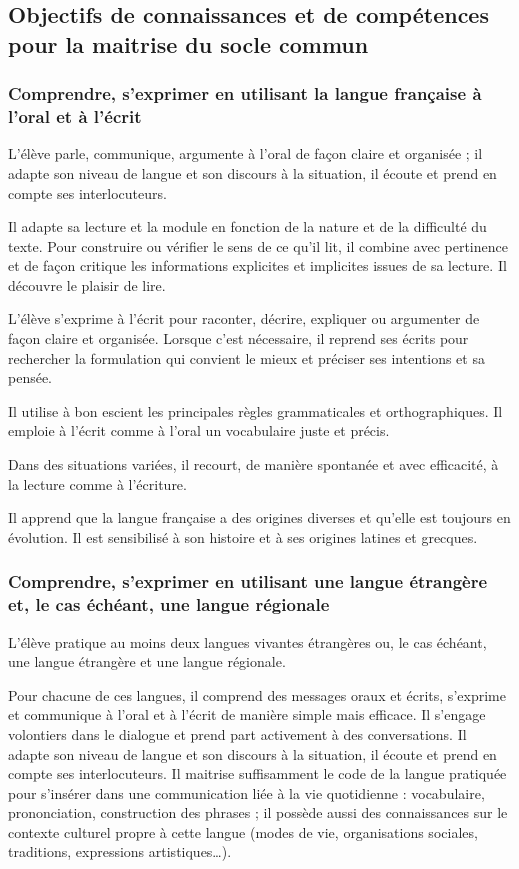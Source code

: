 \subsection{Objectifs de connaissances et de compétences pour la maitrise du socle commun}
\subsubsection{Comprendre, s’exprimer en utilisant la langue française à l’oral et à l’écrit}
L’élève parle, communique, argumente à l’oral de façon claire et organisée ; il adapte son niveau de langue et son discours à la situation, il écoute et prend en compte ses interlocuteurs.

Il adapte sa lecture et la module en fonction de la nature et de la difficulté du texte. Pour construire ou vérifier le sens de ce qu’il lit, il combine avec pertinence et de façon critique les informations explicites et implicites issues de sa lecture. Il découvre le plaisir de lire.

L’élève s’exprime à l’écrit pour raconter, décrire, expliquer ou argumenter de façon claire et organisée. Lorsque c’est nécessaire, il reprend ses écrits pour rechercher la formulation qui convient le mieux et préciser ses intentions et sa pensée.

Il utilise à bon escient les principales règles grammaticales et orthographiques. Il emploie à l’écrit comme à l’oral un vocabulaire juste et précis.

Dans des situations variées, il recourt, de manière spontanée et avec efficacité, à la lecture comme à l’écriture.

Il apprend que la langue française a des origines diverses et qu’elle est toujours en évolution. Il est sensibilisé à son histoire et à ses origines latines et grecques.

\subsubsection{Comprendre, s’exprimer en utilisant une langue étrangère et, le cas échéant, une langue régionale}
L’élève pratique au moins deux langues vivantes étrangères ou, le cas échéant, une langue étrangère et une langue régionale.

Pour chacune de ces langues, il comprend des messages oraux et écrits, s’exprime et communique à l’oral et à l’écrit de manière simple mais efficace. Il s’engage volontiers dans le dialogue et prend part activement à des conversations. Il adapte son niveau de langue et son discours à la situation, il écoute et prend en compte ses interlocuteurs. Il maitrise suffisamment le code de la langue pratiquée pour s’insérer dans une communication liée à la vie quotidienne : vocabulaire, prononciation, construction des phrases ; il possède aussi des connaissances sur le contexte culturel propre à cette langue (modes de vie, organisations sociales, traditions, expressions artistiques\dots).

